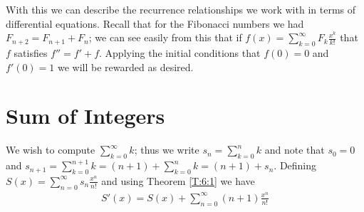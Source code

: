 \documentclass[oneside,12pt]{book}   	%
\theoremstyle{definition}
\begin{document}
\begin{spacing}{1.618}
			With this we can describe the recurrence relationships we work with in terms of differential equations. Recall that for the Fibonacci numbers we had $F_{n+2}=F_{n+1}+F_n$; we can see easily from this that if $f(x)=\sum_{k=0}^\infty F_k \frac{x^k}{k!}$ that $f$ satisfies $f''=f'+f$. Applying the initial conditions that $f(0)=0$ and $f'(0)=1$ we will be rewarded as desired. 
			
		\section{Sum of Integers}
		
			We wish to compute $\sum_{k=0}^\infty k$; thus we write $s_n=\sum_{k=0}^n k$ and note that $s_0=0$ and $s_{n+1}=\sum_{k=0}^{n+1} k = (n+1)+\sum_{k=0}^n k=(n+1)+s_n$. Defining $S(x)=\sum_{n=0}^\infty s_n \frac{x^n}{n!}$ and  using Theorem \ref{T:6:1} we have 
			\begin{alignat}{4}
				S'(x)=S(x)+\sum_{n=0}^\infty (n+1)\frac{x^n}{n!} \label{E:6:2}
			\end{alignat}
	

\end{spacing}
\end{document}
